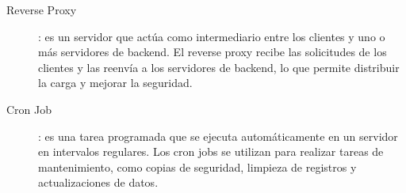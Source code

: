 \begin{description}
    \item [\hypertarget{reverseproxy}{Reverse Proxy}]: es un servidor que actúa como intermediario entre los clientes y uno o más servidores de backend. El reverse proxy recibe las solicitudes de los clientes y las reenvía a los servidores de backend, lo que permite distribuir la carga y mejorar la seguridad.
    \item [\hypertarget{cronjob}{Cron Job}]: es una tarea programada que se ejecuta automáticamente en un servidor en intervalos regulares. Los cron jobs se utilizan para realizar tareas de mantenimiento, como copias de seguridad, limpieza de registros y actualizaciones de datos.
\end{description}

\endinput